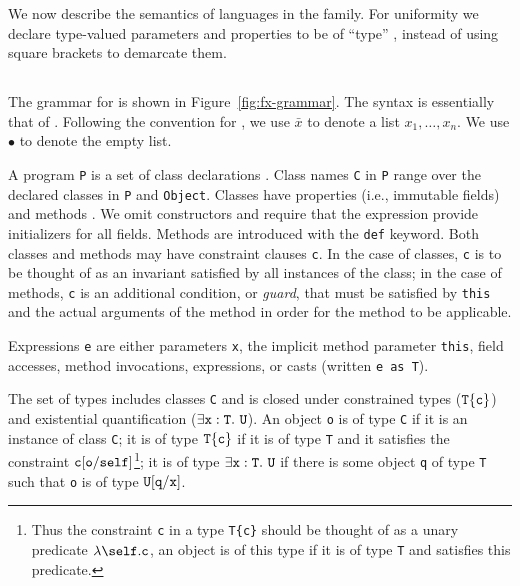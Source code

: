 \newcommand{\constraint}{{\tt constraint}}
\newcommand\cj[2]{{#1} \vdash {#2}~\constraint}
\newcommand\cjj[3]{{#1} \vdash {#2}~\constraint, {#3}~\constraint}
\newcommand\wj[2]{{#1} \vdash {#2}~\type}
\newcommand\tj[3]{{#1} \vdash {#2} \ty {#3}}
\newcommand\stj[3]{{#1} \vdash {#2} \subtype {#3}}

We now describe the semantics of languages in the \FX{} family.
For uniformity we declare type-valued parameters and properties
to be of ``type'' \type, instead of using square brackets to demarcate
them.


\subsection{\FXZ}

The grammar for \FXZ{} is shown in Figure~\ref{fig:fx-grammar}.
The syntax is essentially that of \FJ{}.
Following the convention for \FJ{}, we use $\bar{x}$ to denote a
list $x_1, \dots, x_n$.  We use $\bullet$ to denote the empty
list.

A program {\tt P} is a set of class declarations .
Class names {\tt C} in {\tt P} range over the declared classes in {\tt P} 
and {\tt Object}.
Classes have
properties (i.e., immutable fields)  and methods .  We omit constructors
and require that the \new{} expression provide initializers
for all fields. 
Methods are introduced with the {\tt def} keyword.
Both classes and methods may have constraint clauses
{\tt c}.  In the case of classes, {\tt c} is to be thought of as an
invariant satisfied by all instances of the class; in the case of
methods, {\tt c} is an additional condition, or {\em guard},
that must be satisfied by
{\tt this} and the actual arguments of the method in order for the method to
be applicable. 

Expressions {\tt e} are either parameters {\tt x}, the implicit
method parameter {\tt this}, field accesses, method invocations, \new{}
expressions, or casts (written {\tt e as T}).

The set of types includes classes {\tt C} and is closed under
constrained types ($\tt T\{c\}$) and existential
quantification ($\exists \tt x:T.~U$).
An object {\tt o} is of type {\tt C} if it is an instance of class {\tt C}; it is of type $\tt
T\{c\}$ if it is of type {\tt T} and it satisfies the constraint $\tt
c[o/self]$\footnote{Thus the constraint {\tt c} in a type {\tt T\{c\}}
should be thought of as a unary predicate $\lambda\self.{\tt c}$, an
object is of this type if it is of type {\tt T} and satisfies this
predicate.}; it is of type $\exists \tt x:T.~U$
if there is some object {\tt q}
of type {\tt T} such that {\tt o} is of type
$\tt U[q/x]$.

